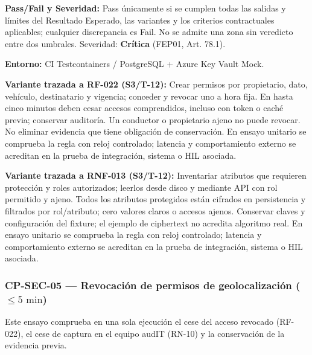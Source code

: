 \par\noindent\textbf{Pass/Fail y Severidad:} Pass únicamente si se cumplen todas las salidas y límites del Resultado Esperado, las variantes y los criterios contractuales aplicables; cualquier discrepancia es Fail. No se admite una zona sin veredicto entre dos umbrales. Severidad: \textbf{Crítica} (FEP01, Art. 78.1).\par
\par\noindent\textbf{Entorno:} CI Testcontainers / PostgreSQL + Azure Key Vault Mock.\par







\par\noindent\textbf{Variante trazada a RF-022 (S3/T-12):} Crear permisos por propietario, dato, vehículo, destinatario y vigencia; conceder y revocar uno a hora fija. En hasta cinco minutos deben cesar accesos comprendidos, incluso con token o caché previa; conservar auditoría. Un conductor o propietario ajeno no puede revocar. No eliminar evidencia que tiene obligación de conservación. En ensayo unitario se comprueba la regla con reloj controlado; latencia y comportamiento externo se acreditan en la prueba de integración, sistema o HIL asociada.\par

\par\noindent\textbf{Variante trazada a RNF-013 (S3/T-12):} Inventariar atributos que requieren protección y roles autorizados; leerlos desde disco y mediante API con rol permitido y ajeno. Todos los atributos protegidos están cifrados en persistencia y filtrados por rol/atributo; cero valores claros o accesos ajenos. Conservar claves y configuración del fixture; el ejemplo de ciphertext no acredita algoritmo real. En ensayo unitario se comprueba la regla con reloj controlado; latencia y comportamiento externo se acreditan en la prueba de integración, sistema o HIL asociada.\par
\subsubsection*{CP-SEC-05 — Revocación de permisos de geolocalización (\(\le 5\text{ min}\))}\label{sec:9-cp-sec-05}
Este ensayo comprueba en una sola ejecución el cese del acceso revocado (RF-022), el cese de captura en el equipo audIT (RN-10) y la conservación de la evidencia previa.

